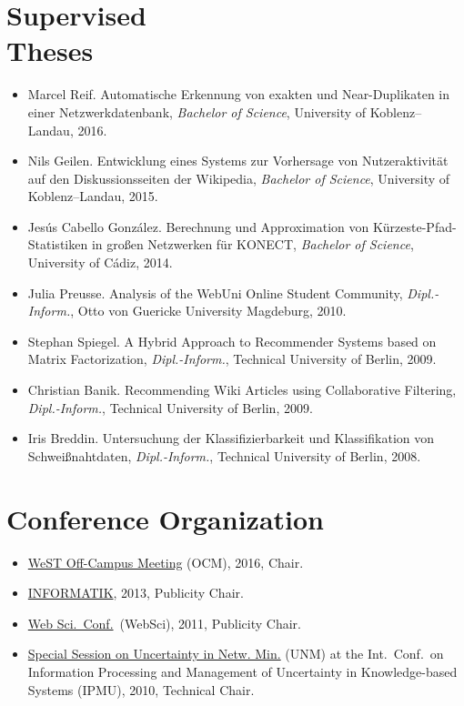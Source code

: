 \documentclass[line,margin]{res}
\begin{document}
\begin{resume}
\section{Supervised \\ Theses}
\begin{itemize}
\item Marcel Reif.  Automatische Erkennung von exakten und
  Near-Duplikaten in einer Netzwerkdatenbank, \emph{Bachelor of
    Science}, University of Koblenz--Landau, 2016.
\item Nils Geilen.  Entwicklung eines Systems zur Vorhersage von
  Nutzeraktivität auf den Diskussionsseiten der Wikipedia,
  \emph{Bachelor of Science}, University of Koblenz--Landau, 2015.
\item Jesús Cabello González.  Berechnung und Approximation von
  Kürzeste-Pfad-Statistiken in großen Netzwerken für KONECT,
  \emph{Bachelor of Science}, University of Cádiz, 2014. 
\item Julia Preusse. Analysis of the WebUni Online Student Community,
  \emph{Dipl.-Inform.}, Otto von Guericke University Magdeburg, 2010.  
\item Stephan Spiegel.  A Hybrid Approach to Recommender Systems based
  on Matrix Factorization, \emph{Dipl.-Inform.}, Technical University of
  Berlin, 2009.  
\item Christian Banik.  Recommending Wiki Articles using Collaborative
  Filtering, \emph{Dipl.-Inform.}, Technical University of Berlin, 2009. 
\item Iris Breddin.  Untersuchung der Klassifizierbarkeit und
  Klassifikation von Schweißnahtdaten, \emph{Dipl.-Inform.}, Technical
  University of Berlin, 2008.    
\end{itemize}

\section{Conference Organization}
\begin{itemize}
\item \href{https://sites.google.com/site/ocm2016/}{WeST Off-Campus
  Meeting} (OCM), 2016, Chair. 
\item \href{http://informatik2013.de/}{INFORMATIK}, 2013, Publicity Chair. 
\item \href{http://www.websci11.org/}{Web Sci.\ Conf.}\ (WebSci), 2011,
  Publicity Chair.  
\item \href{http://www.dai-labor.de/unm2010/}{Special Session on
  Uncertainty in Netw. Min.} (UNM) at the Int.\ Conf.\ on Information
  Processing and Management of Uncertainty in Knowledge-based Systems (IPMU),
  2010, Technical Chair.   
\end{itemize}


\end{resume}
\end{document}
